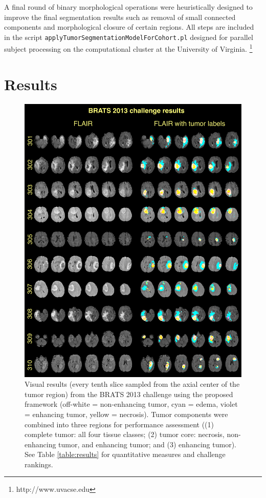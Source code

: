 \documentclass[preprint,authoryear,review,12pt]{elsarticle}
\begin{document}
{A final round of binary morphological operations were heuristically designed
to improve the final segmentation results such as removal of small connected 
components and morphological closure of certain regions.
All steps are included in the script 
{\tt applyTumorSegmentationModelForCohort.pl} designed for parallel subject 
processing on the computational cluster at the University of Virginia.%
\footnote{
http://www.uvacse.edu
}




%
%

\section{Results}


\begin{figure}[!htb]
  \centering
  \includegraphics[width=120mm]{Figures/challengeResults.pdf}
  \caption{Visual results (every tenth slice sampled from the axial center of the
  tumor region) from the BRATS 2013 challenge using the proposed
  framework (off-white = non-enhancing tumor, cyan = edema, violet = enhancing 
  tumor, yellow = necrosis).  Tumor components were combined into
  three regions for performance assessment ((1) complete tumor: all four tissue
  classes; (2) tumor core:  necrosis, non-enhancing tumor, and enhancing tumor;
  and (3) enhancing tumor).  See Table \ref{table:results} for quantitative measures
  and challenge rankings.
  }
  \label{fig:challengeresults}
\end{figure}




}
\end{document}
